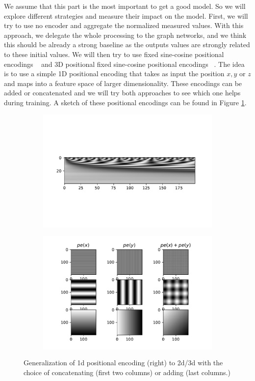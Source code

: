 \documentclass[a4paper,10pt]{article}
\begin{document}
We assume that this part is the most important to get a good model. So we will explore different strategies and measure their impact on the model. First, we will try to use no encoder and aggregate the normalized measured values. With this approach, we delegate the whole processing to the graph networks, and we think this should be already a strong baseline as the outputs values are strongly related to these initial values. We will then try to use fixed sine-cosine positional encodings ~\cite{vaswani2017attention} and 3D positional fixed sine-cosine positional encodings ~\cite{chu2021conditional}. The idea is to use a simple 1D positional encoding that takes as input the position $x,y$ or $z$ and maps into a feature space of larger dimensionality. These encodings can be added or concatenated and we will try both approaches to see which one helps during training. A sketch of these positional encodings can be found in Figure \ref{fig:posenc}.

\begin{figure}
  \begin{subfigure}{0.4\textwidth}
    \includegraphics[width=\textwidth]{../windgraph/1dposenc}
  \end{subfigure}
  \begin{subfigure}{0.5\textwidth}
    \includegraphics[width=\textwidth]{../windgraph/posenc}
  \end{subfigure}
  \caption{Generalization of 1d positional encoding (right) to 2d/3d with the choice of concatenating (first two columns) or adding (last columns.)}
  \label{fig:posenc}
\end{figure}
\end{document}
